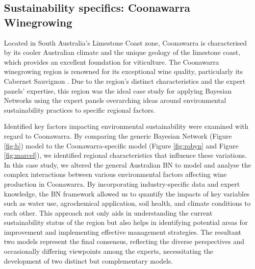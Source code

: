 \subsection{Sustainability specifics: Coonawarra Winegrowing}

Located in South Australia's Limestone Coast zone, Coonawarra is characterised by its cooler Australian climate and the unique geology of the limestone coast, which provides an excellent foundation for viticulture. The Coonawarra winegrowing region is renowned for its exceptional wine quality, particularly its Cabernet Sauvignon \cite{hallidayAustralianWineEncyclopedia2009}. Due to the region's distinct characteristics and the expert panels' expertise, this region was the ideal case study for applying Bayesian Networks using the expert panels overarching ideas around environmental sustainability practices to specific regional factors.

Identified key factors impacting environmental sustainability were examined with regard to Coonawarra. By comparing the generic Bayesian Network (Figure \ref{fig:b}) model to the Coonawarra-specific model (Figure \ref{fig:robyn} and Figure \ref{fig:marcel}), we identified regional characteristics that influence these variations. In this case study, we altered the general Australian BN to model and analyse the complex interactions between various environmental factors affecting wine production in Coonawarra. By incorporating industry-specific data and expert knowledge, the BN framework allowed us to quantify the impacts of key variables such as water use, agrochemical application, soil health, and climate conditions to each other. This approach not only aids in understanding the current sustainability status of the region but also helps in identifying potential areas for improvement and implementing effective management strategies. The resultant two models represent the final consensus, reflecting the diverse perspectives and occasionally differing viewpoints among the experts, necessitating the development of two distinct but complementary models.


